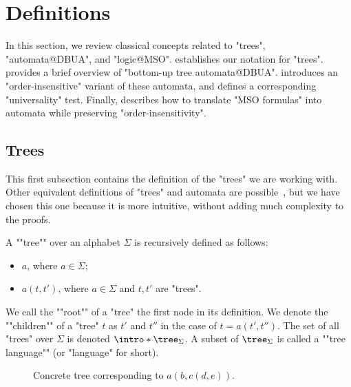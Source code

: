 \documentclass[a4paper,UKenglish,cleveref, autoref, thm-restate]{lipics-v2021}
\begin{document}
\section{Definitions} \label{sec:definitions}

In this section, we review classical concepts related to "trees", "automata@DBUA", and "logic@MSO".
 establishes our notation for "trees".
 provides a brief overview of "bottom-up tree automata@DBUA".
 introduces an "order-insensitive" variant of these automata, and
 defines a corresponding "universality" test.
Finally,  describes how to translate "MSO formulas" into automata while preserving "order-insensitivity".
\subsection{Trees}\label{sec:trees}

This first subsection contains the definition of the "trees" we are working with. Other equivalent definitions of "trees" and
automata are possible~\cite{Thomas1997, tata}, but we have chosen this one because it is more intuitive, without adding much complexity to the proofs.

\begin{definition}
	\AP A ""tree"" over an alphabet $\Sigma$ is recursively defined as follows:
	\begin{itemize}
		\item $a$, where $a \in \Sigma$;
		\item $a(t,t')$, where $a \in \Sigma$ and $t, t'$ are "trees".
	\end{itemize}
	We call the ""root"" of a "tree" the first node in its definition.
	We denote the ""children"" of a "tree" $t$ as $t'$ and $t''$ in the case of $t = a(t',t'')$.
	The set of all "trees" over $\Sigma$ is denoted $\intro* \tree_{\Sigma}$.
	A subset of $\tree_{\Sigma}$ is called a ""tree language"" (or "language" for short).
\end{definition}

\begin{figure}[h]
	\centering


	\caption{Concrete tree corresponding to $a(b, c(d, e))$.}
\end{figure}
\end{document}

